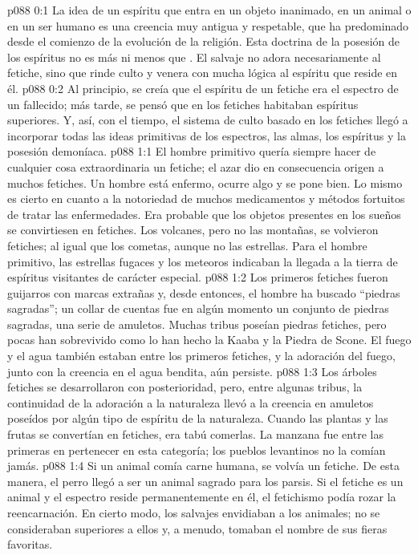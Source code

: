 \author{Brillante estrella vespertina}
\vs p088 0:1 La idea de un espíritu que entra en un objeto inanimado, en un animal o en un ser humano es una creencia muy antigua y respetable, que ha predominado desde el comienzo de la evolución de la religión. Esta doctrina de la posesión de los espíritus no es más ni menos que . El salvaje no adora necesariamente al fetiche, sino que rinde culto y venera con mucha lógica al espíritu que reside en él.
\vs p088 0:2 Al principio, se creía que el espíritu de un fetiche era el espectro de un fallecido; más tarde, se pensó que en los fetiches habitaban espíritus superiores. Y, así, con el tiempo, el sistema de culto basado en los fetiches llegó a incorporar todas las ideas primitivas de los espectros, las almas, los espíritus y la posesión demoníaca.
\vs p088 1:1 El hombre primitivo quería siempre hacer de cualquier cosa extraordinaria un fetiche; el azar dio en consecuencia origen a muchos fetiches. Un hombre está enfermo, ocurre algo y se pone bien. Lo mismo es cierto en cuanto a la notoriedad de muchos medicamentos y métodos fortuitos de tratar las enfermedades. Era probable que los objetos presentes en los sueños se convirtiesen en fetiches. Los volcanes, pero no las montañas, se volvieron fetiches; al igual que los cometas, aunque no las estrellas. Para el hombre primitivo, las estrellas fugaces y los meteoros indicaban la llegada a la tierra de espíritus visitantes de carácter especial.
\vs p088 1:2 Los primeros fetiches fueron guijarros con marcas extrañas y, desde entonces, el hombre ha buscado “piedras sagradas”; un collar de cuentas fue en algún momento un conjunto de piedras sagradas, una serie de amuletos. Muchas tribus poseían piedras fetiches, pero pocas han sobrevivido como lo han hecho la Kaaba y la Piedra de Scone. El fuego y el agua también estaban entre los primeros fetiches, y la adoración del fuego, junto con la creencia en el agua bendita, aún persiste.
\vs p088 1:3 Los árboles fetiches se desarrollaron con posterioridad, pero, entre algunas tribus, la continuidad de la adoración a la naturaleza llevó a la creencia en amuletos poseídos por algún tipo de espíritu de la naturaleza. Cuando las plantas y las frutas se convertían en fetiches, era tabú comerlas. La manzana fue entre las primeras en pertenecer en esta categoría; los pueblos levantinos no la comían jamás.
\vs p088 1:4 Si un animal comía carne humana, se volvía un fetiche. De esta manera, el perro llegó a ser un animal sagrado para los parsis. Si el fetiche es un animal y el espectro reside permanentemente en él, el fetichismo podía rozar la reencarnación. En cierto modo, los salvajes envidiaban a los animales; no se consideraban superiores a ellos y, a menudo, tomaban el nombre de sus fieras favoritas.
